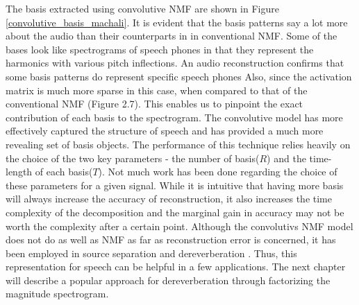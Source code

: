 The basis extracted using convolutive NMF are shown in Figure \ref{convolutive_basis_machali}. It is evident that the basis patterns say a lot more about the audio than their counterparts in in conventional NMF. Some of the bases look like spectrograms of speech phones in that they represent the harmonics with various pitch inflections. An audio reconstruction confirms that some basis patterns do represent specific speech phones\cite{A} Also, since the activation matrix is much more sparse in this case, when compared to that of the conventional NMF (Figure 2.7). This enables us to pinpoint the exact contribution of each basis to the spectrogram.
The convolutive model has more effectively captured the structure of speech and has provided a much more revealing set of basis objects. The performance of this technique relies heavily on the choice of the two key parameters - the number of basis($R$) and the time-length of each basis($T$). Not much work has been done regarding the choice of these parameters for a given signal. 
While it is intuitive that having more basis will always increase the accuracy of reconstruction, it also increases the time complexity of the decomposition and the marginal gain in accuracy may not be worth the complexity after a certain point.
Although the convolutivs NMF model does not do as well as NMF as far as reconstruction error is concerned, it has been employed in source separation \cite{paris} and dereverberation \cite{baby}. Thus, this representation for speech can be helpful in a few applications.
The next chapter will describe a popular approach for dereverberation through factorizing the magnitude spectrogram. 

